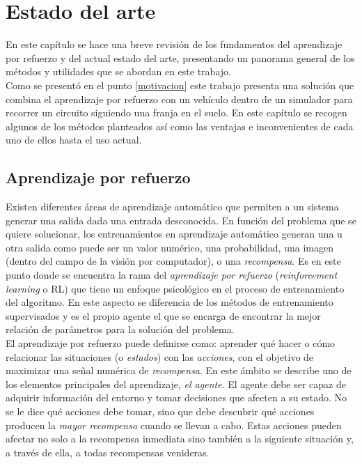 \chapter{Estado del arte}\label{estado-del-arte}

En este capítulo se hace una breve revisión de los fundamentos del aprendizaje por refuerzo y del actual estado del arte, presentando un panorama general de los métodos y utilidades que se abordan en este trabajo.\\

Como se presentó en el punto \ref{motivacion} este trabajo presenta una solución que combina el aprendizaje por refuerzo con un vehículo dentro de un simulador para recorrer un circuito siguiendo una franja en el suelo. En este capítulo se recogen algunos de los métodos planteados así como las ventajas e inconvenientes de cada uno de ellos hasta el uso actual.\\

\section{Aprendizaje por refuerzo}

Existen diferentes áreas de aprendizaje automático que permiten a un sistema generar una salida dada una entrada desconocida. En función del problema que se quiere solucionar, los entrenamientos en aprendizaje automático generan una u otra salida como puede ser un valor numérico, una probabilidad, una imagen (dentro del campo de la visión por computador), o una \textit{recompensa}. Es en este punto donde se encuentra la rama del \textit{aprendizaje por refuerzo} (\textit{reinforcement learning} o RL) que tiene un enfoque psicológico en el proceso de entrenamiento del algoritmo. En este aspecto se diferencia de los métodos de entrenamiento supervisados y es el propio agente el que se encarga de encontrar la mejor relación de parámetros para la solución del problema.\\

El aprendizaje por refuerzo puede definirse como: aprender qué hacer o cómo relacionar las situaciones (o \textit{estados}) con las \textit{acciones}, con el objetivo de maximizar una señal numérica de \textit{recompensa}. En este ámbito se describe uno de los elementos principales del aprendizaje, \textit{el agente}. El agente debe ser capaz de adquirir información del entorno y tomar decisiones que afecten a su estado. No se le dice qué acciones debe tomar, sino que debe descubrir qué acciones producen la \textit{mayor recompensa} cuando se llevan a cabo. Estas acciones pueden afectar no solo a la recompensa inmediata sino también a la siguiente situación y, a través de ella, a todas recompensas venideras.\\

